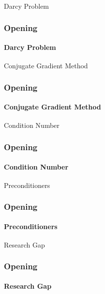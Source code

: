 \begin{frame}[label=opening]{Darcy Problem}
    \frametitle{Opening}
    \framesubtitle{Darcy Problem}
\end{frame}

\begin{frame}[label=opening]{Conjugate Gradient Method}
    \frametitle{Opening}
    \framesubtitle{Conjugate Gradient Method}
\end{frame}

\begin{frame}[label=opening]{Condition Number}
    \frametitle{Opening}
    \framesubtitle{Condition Number}
\end{frame}

\begin{frame}[label=opening]{Preconditioners}
    \frametitle{Opening}
    \framesubtitle{Preconditioners}
\end{frame}

\begin{frame}[label=opening]{Research Gap}
    \frametitle{Opening}
    \framesubtitle{Research Gap}
\end{frame}